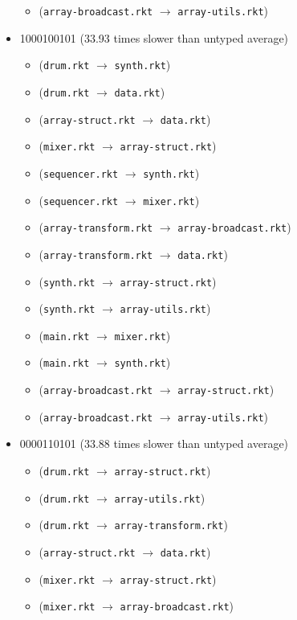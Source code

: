 \documentclass{article}
\newcommand{\mono}[1]{\texttt{#1}}
\begin{document}
\begin{itemize}
\begin{itemize}
  \item (\mono{array-broadcast.rkt} $\rightarrow$ \mono{array-utils.rkt})
  \end{itemize}
\item 1000100101 (33.93 times slower than untyped average)
  \begin{itemize}
  \item (\mono{drum.rkt} $\rightarrow$ \mono{synth.rkt})
  \item (\mono{drum.rkt} $\rightarrow$ \mono{data.rkt})
  \item (\mono{array-struct.rkt} $\rightarrow$ \mono{data.rkt})
  \item (\mono{mixer.rkt} $\rightarrow$ \mono{array-struct.rkt})
  \item (\mono{sequencer.rkt} $\rightarrow$ \mono{synth.rkt})
  \item (\mono{sequencer.rkt} $\rightarrow$ \mono{mixer.rkt})
  \item (\mono{array-transform.rkt} $\rightarrow$ \mono{array-broadcast.rkt})
  \item (\mono{array-transform.rkt} $\rightarrow$ \mono{data.rkt})
  \item (\mono{synth.rkt} $\rightarrow$ \mono{array-struct.rkt})
  \item (\mono{synth.rkt} $\rightarrow$ \mono{array-utils.rkt})
  \item (\mono{main.rkt} $\rightarrow$ \mono{mixer.rkt})
  \item (\mono{main.rkt} $\rightarrow$ \mono{synth.rkt})
  \item (\mono{array-broadcast.rkt} $\rightarrow$ \mono{array-struct.rkt})
  \item (\mono{array-broadcast.rkt} $\rightarrow$ \mono{array-utils.rkt})
  \end{itemize}
\item 0000110101 (33.88 times slower than untyped average)
  \begin{itemize}
  \item (\mono{drum.rkt} $\rightarrow$ \mono{array-struct.rkt})
  \item (\mono{drum.rkt} $\rightarrow$ \mono{array-utils.rkt})
  \item (\mono{drum.rkt} $\rightarrow$ \mono{array-transform.rkt})
  \item (\mono{array-struct.rkt} $\rightarrow$ \mono{data.rkt})
  \item (\mono{mixer.rkt} $\rightarrow$ \mono{array-struct.rkt})
  \item (\mono{mixer.rkt} $\rightarrow$ \mono{array-broadcast.rkt})

\end{itemize}
\end{itemize}
\end{document}
